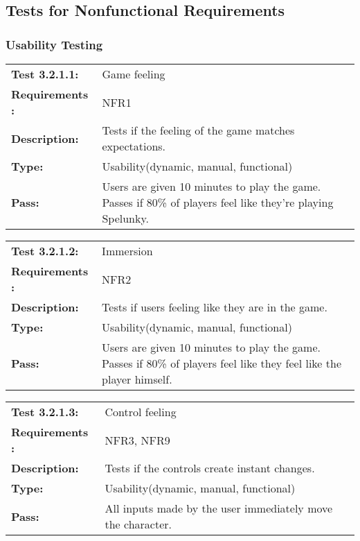 \documentclass[12pt, titlepage]{article}
\begin{document}
\subsection{Tests for Nonfunctional Requirements}

\subsubsection{Usability Testing}

\begin{tabular}{|l|p{10cm}|}
    \hline
    \bf{Test} 3.2.1.1: & Game feeling \\
    \bf{Requirements} : & NFR1 \\
    \bf{Description}: & Tests if the feeling of the game matches expectations. \\
    \bf{Type}: & Usability(dynamic, manual, functional) \\
    \bf{Pass}: & Users are given 10 minutes to play the game. Passes if 80\% of players feel like they're playing Spelunky. \\
    \hline
\end{tabular}

\begin{tabular}{|l|p{10cm}|}
    \hline
    \bf{Test} 3.2.1.2: & Immersion \\
    \bf{Requirements} : & NFR2 \\
    \bf{Description}: & Tests if users feeling like they are in the game. \\
    \bf{Type}: & Usability(dynamic, manual, functional) \\
    \bf{Pass}: & Users are given 10 minutes to play the game. Passes if 80\% of players feel like they feel like the player himself. \\
    \hline
\end{tabular}

\begin{tabular}{|l|p{10cm}|}
    \hline
    \bf{Test} 3.2.1.3: & Control feeling \\
    \bf{Requirements} : & NFR3, NFR9 \\
    \bf{Description}: & Tests if the controls create instant changes. \\
    \bf{Type}: & Usability(dynamic, manual, functional) \\
    \bf{Pass}: & All inputs made by the user immediately move the character. \\
    \hline
\end{tabular}
\end{document}
